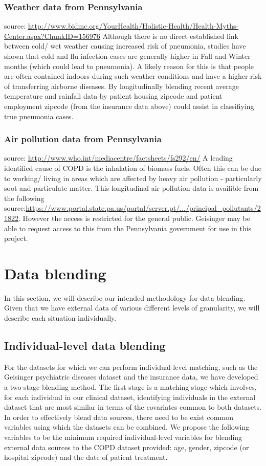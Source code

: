 \documentclass{article}
\begin{document}
\subsubsection{Weather data from Pennsylvania}
source: \url{http://www.bidmc.org/YourHealth/Holistic-Health/Health-Myths-Center.aspx?ChunkID=156976}
Although there is no direct established link between cold/ wet weather causing 
increased risk of pneumonia, studies have shown that cold and flu infection cases are 
generally higher in Fall and Winter months (which could lead to pneumonia). A 
likely reason for this is that people are often contained indoors during such 
weather conditions and have a higher risk of transferring airborne diseases. 
By longitudinally  blending recent average temperature and rainfall data 
by patient housing zipcode and patient employment zipcode (from the insurance 
data above) could assist in classifiying true pneumonia cases. 

\subsubsection{Air pollution data from Pennsylvania}
source: \url{http://www.who.int/mediacentre/factsheets/fs292/en/}
A leading identified cause of COPD is the inhalation of biomass fuels. Often 
this can be due to working/ living in areas which are affected by heavy air 
pollution - particularly soot and particulate matter. This longitudinal air pollution
data is availible from the following source:\url{https://www.portal.state.pa.us/portal/server.pt/.../principal_pollutants/21822}. However the access is restricted for the general public.
Geisinger may be able to request access to this from the Pennsylvania government
for use in this project.

\section{Data blending}
In this section, we will describe our intended methodology for data blending. 
Given that we have external data of various different levels of granularity, 
we will describe each situation individually.


\subsection{Individual-level data blending}

For the datasets for which we can perform individual-level matching, such as the Geisinger psychiatric diseases dataset and the insurance data, we have developed a two-stage blending method. The first stage is a matching stage which involves, for each individual in our clinical dataset, identifying individuals in the external dataset that are most similar in terms of the covariates common to both datasets. In order to effectively blend data sources, there need to be exist common variables using which the datasets can be combined. We propose the following variables to be the minimum required individual-level variables for blending external data sources to the COPD dataset provided: age, gender, zipcode (or hospital zipcode) and the date of patient treatment.
\end{document}
